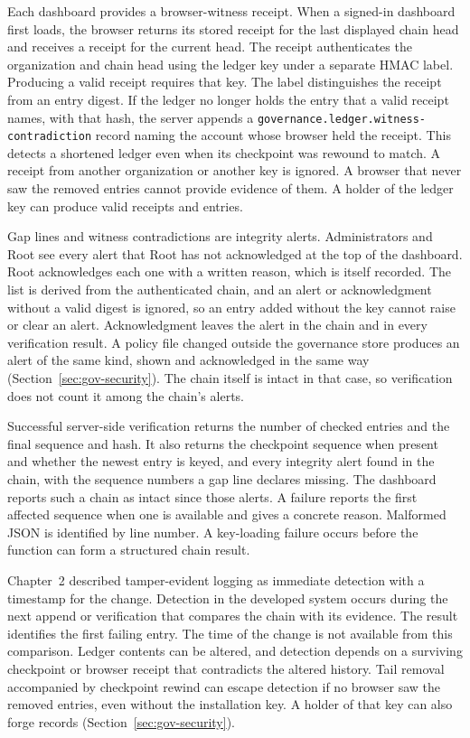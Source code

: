 {\color{red}Each dashboard provides a browser-witness receipt. When a signed-in
dashboard first loads, the browser returns its stored receipt for the last
displayed chain head and receives a receipt for the current head. The receipt
authenticates the organization and chain head using the ledger key under a
separate HMAC label. Producing a valid receipt requires that key. The label
distinguishes the receipt from an entry digest. If the ledger no longer holds the entry that a
valid receipt names, with that hash, the server appends a
\texttt{governance.ledger.witness-contradiction} record naming the account
whose browser held the receipt. This detects a shortened ledger even when its
checkpoint was rewound to match. A receipt from another organization or
another key is ignored. A browser that never saw the removed entries cannot
provide evidence of them. A holder of the ledger key can produce valid receipts
and entries.

Gap lines and witness contradictions are integrity alerts. Administrators and
Root see every alert that Root has not acknowledged at the top of the
dashboard. Root acknowledges each one with a written reason, which is itself
recorded. The list is derived from the authenticated chain, and an alert or
acknowledgment without a valid digest is ignored, so an entry added without
the key cannot raise or clear an alert. Acknowledgment leaves the alert in the
chain and in every verification result. A policy file
changed outside the governance store produces an alert of the same kind, shown
and acknowledged in the same way (Section~\ref{sec:gov-security}). The chain
itself is intact in that case, so verification does not count it among the
chain's alerts.}

Successful server-side verification returns the number of checked entries and the final sequence and hash. It also returns the checkpoint sequence when present and whether the newest entry is keyed{\color{red}, and every integrity alert found in the chain, with the sequence numbers a gap line declares missing. The dashboard reports such a chain as intact since those alerts}. A failure reports the first affected sequence when one is available and gives a concrete reason. Malformed JSON is identified by line number. A key-loading failure occurs before the function can form a structured chain result.

{\color{red}Chapter~2 described tamper-evident logging as immediate detection
with a timestamp for the change. Detection in the developed system occurs
during the next append or verification that compares the chain with its
evidence. The result identifies the first failing entry. The time of the
change is not available from this comparison. Ledger contents can be altered,
and detection depends on a surviving checkpoint or browser receipt
that contradicts the altered history. Tail removal accompanied by checkpoint
rewind can escape detection if no browser saw the removed entries, even
without the installation key. A holder of that key can also forge records
(Section~\ref{sec:gov-security}).}

